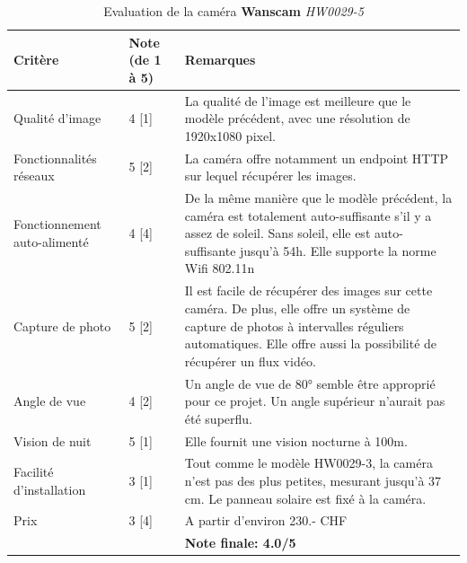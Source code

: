 \begin{table}[H]
    \centering
    \caption{Evaluation de la caméra \textbf{Wanscam} \textit{HW0029-5}}
    \label{cam:wan5_eval}
    \begin{tabular}{@{}llp{8cm}@{}}
        \toprule
        Critère                      & Note (de 1 à 5) & Remarques                                           \\ \midrule
        Qualité d'image              & 4 {[}1{]}       & La qualité de l'image est meilleure que le modèle précédent, avec une résolution de 1920x1080 pixel.                                                              \\ [0.8ex]
        Fonctionnalités réseaux      & 5 {[}2{]}       & La caméra offre notamment un endpoint HTTP sur lequel récupérer les images.                                                                                       \\ [0.8ex]
        Fonctionnement auto-alimenté & 4 {[}4{]}       & De la même manière que le modèle précédent, la caméra est totalement auto-suffisante s'il y a assez de soleil. Sans soleil, elle est auto-suffisante jusqu'à 54h. Elle supporte la norme Wifi 802.11n \\ [0.8ex]
        Capture de photo             & 5 {[}2{]}       & Il est facile de récupérer des images sur cette caméra. De plus, elle offre un système de capture de photos à intervalles réguliers automatiques. Elle offre aussi la possibilité de récupérer un flux vidéo.                  \\ [0.8ex]
        Angle de vue                 & 4 {[}2{]}       & Un angle de vue de 80° semble être approprié pour ce projet. Un angle supérieur n'aurait pas été superflu.                                                        \\ [0.8ex]
        Vision de nuit               & 5 {[}1{]}       & Elle fournit une vision nocturne à 100m.                                                                                                                          \\ [0.8ex]
        Facilité d'installation      & 3 {[}1{]}       & Tout comme le modèle HW0029-3, la caméra n'est pas des plus petites, mesurant jusqu'à 37 cm. Le panneau solaire est fixé à la caméra.                             \\ [0.8ex]
        Prix                         & 3 {[}4{]}       & A partir d'environ 230.- CHF   \\ \midrule
        && \textbf{Note finale: 4.0/5} \\ \bottomrule
    \end{tabular}
\end{table}


